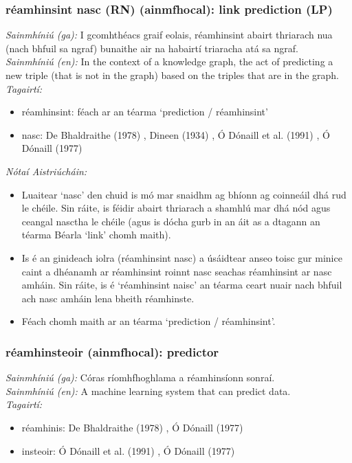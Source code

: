 \subsubsection*{réamhinsint nasc (RN) (ainmfhocal): link prediction (LP)}
 \noindent \textit{Sainmhíniú (ga):} I gcomhthéacs graif eolais, réamhinsint abairt thriarach nua (nach bhfuil sa ngraf) bunaithe air na habairtí triaracha atá sa ngraf.
\\
 \noindent \textit{Sainmhíniú (en):} In the context of a knowledge graph, the act of predicting a new triple (that is not in the graph) based on the triples that are in the graph.
\\
 \noindent \textit{Tagairtí:}
\begin{itemize}
	\item réamhinsint: féach ar an téarma `prediction / réamhinsint'
	\item nasc: De Bhaldraithe (1978) \cite{de-bhaldraithe}, Dineen (1934) \cite{dineen}, Ó Dónaill et al. (1991) \cite{focloir-beag}, Ó Dónaill (1977) \cite{odonaill}
\end{itemize}

 \noindent \textit{Nótaí Aistriúcháin:}
\begin{itemize}
	\item Luaitear `nasc' den chuid is mó mar snaidhm ag bhíonn ag coinneáil dhá rud le chéile. Sin ráite, is féidir abairt thriarach a shamhlú mar dhá nód agus ceangal nasctha le chéile (agus is dócha gurb in an áit as a dtagann an téarma Béarla `link' chomh maith).
	\item Is é an ginideach iolra (réamhinsint nasc) a úsáidtear anseo toisc gur minice caint a dhéanamh ar réamhinsint roinnt nasc seachas réamhinsint ar nasc amháin. Sin ráite, is é `réamhinsint naisc' an téarma ceart nuair nach bhfuil ach nasc amháin lena bheith réamhinste.
	\item Féach chomh maith ar an téarma `prediction / réamhinsint'.
\end{itemize}


\subsubsection*{réamhinsteoir (ainmfhocal): predictor}
 \noindent \textit{Sainmhíniú (ga):} Córas ríomhfhoghlama a réamhinsíonn sonraí.
\\
 \noindent \textit{Sainmhíniú (en):} A machine learning system that can predict data.
\\
 \noindent \textit{Tagairtí:}
\begin{itemize}
	\item réamhinis: De Bhaldraithe (1978) \cite{de-bhaldraithe}, Ó Dónaill (1977) \cite{odonaill}
	\item insteoir: Ó Dónaill et al. (1991) \cite{focloir-beag}, Ó Dónaill (1977) \cite{odonaill}
\end{itemize}

